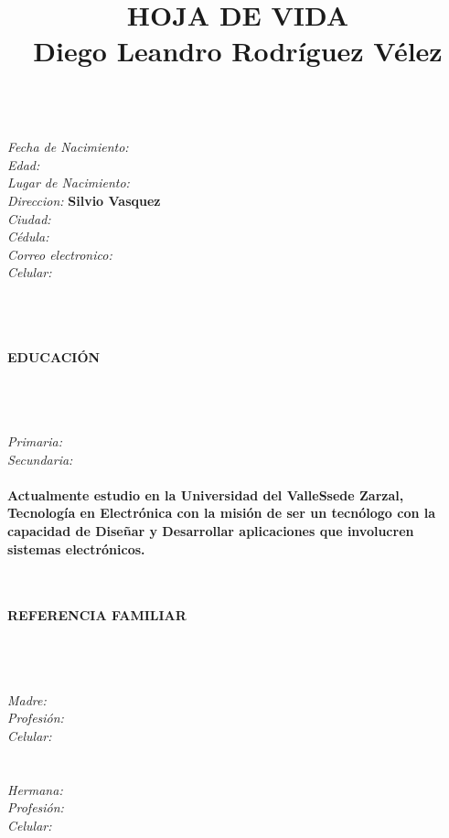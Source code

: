 \documentclass[letterpaper, 12pt]{article}
\title{\bf HOJA DE VIDA \\ Diego Leandro Rodríguez Vélez}
\date{}
\begin{document}
\maketitle
\
\\ 
\emph{Fecha de Nacimiento:}\hspace {5 mm}{\bf2000, Diciembre 8}\\  
\emph{Edad:} \hspace {3,2cm}{\bf  19 Años} \\
\emph{Lugar de Nacimiento:}\hspace {4 mm}{\bf  Obando Valle del Cauca} \\
\emph{Direccion:} \hspace{2,3 cm} {\bf Silvio Vasquez}\\
\emph{Ciudad:} \hspace {2,8 cm}{\bf Obando} \\
\emph{Cédula:} \hspace {2,8cm}{\bf 1007886112} \\
\emph{Correo electronico:} \hspace {8 mm}{\bf diego.leandro.rodriguez@correounivalle.edu.co} \\
\emph{Celular:}\hspace {2,9 cm}{\bf 320 761 5079 } \\ \\ \\ \\
\centerline{\bf EDUCACIÓN}\\ \\ \\
\emph{Primaria:}\hspace {2,5 cm}{\bf Ricardo Nieto } \\
\emph{Secundaria:}\hspace {2,2 cm}{\bf Institución Educativa San José } \\ \\

{\bf Actualmente estudio en la Universidad  del ValleSsede Zarzal, Tecnología en Electrónica con la misión de ser un tecnólogo con la capacidad de Diseñar y Desarrollar aplicaciones que involucren sistemas electrónicos.} \\ \\ \\ 
\centerline{\bf REFERENCIA FAMILIAR}\\ \\ \\ 
\emph{Madre:} \hspace {2,9 cm}{\bf  Blanca Yuliet Vélez Pedreros} \\
\emph{Profesión:}\hspace {2,5 cm}{\bf Docente} \\
\emph{Celular:}\hspace {2,9 cm}{\bf 315 464 8841 } \\ \\ \\
\emph{Hermana:} \hspace {2,4 cm}{\bf  Leidy Viviana Gomez Velez} \\
\emph{Profesión:}\hspace {2,5 cm}{\bf Tecnologa} \\
\emph{Celular:}\hspace {2,9 cm}{\bf 316 823 3150 }
\end{document}
